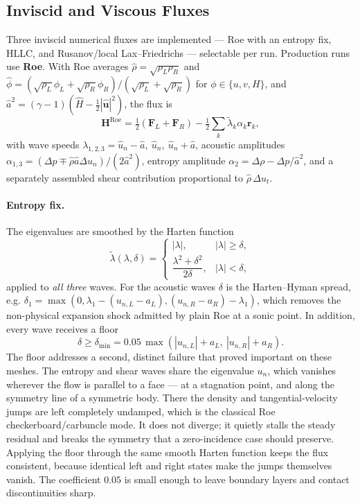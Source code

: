\subsection{Inviscid and Viscous Fluxes}
\label{sec:fluxes}

Three inviscid numerical fluxes are implemented --- Roe with an entropy fix,
HLLC, and Rusanov/local Lax--Friedrichs --- selectable per run. Production runs
use \textbf{Roe}. With Roe averages
$\hat{\rho}=\sqrt{\rho_L\rho_R}$ and
$\hat{\phi}=(\sqrt{\rho_L}\phi_L+\sqrt{\rho_R}\phi_R)/(\sqrt{\rho_L}+\sqrt{\rho_R})$
for $\phi\in\{u,v,H\}$, and $\hat{a}^2=(\gamma-1)(\hat{H}-\tfrac12|\hat{\mathbf{u}}|^2)$,
the flux is
\begin{equation}
  \mathbf{H}^{\mathrm{Roe}}=\tfrac12\left(\mathbf{F}_L+\mathbf{F}_R\right)
  -\tfrac12\sum_{k}\tilde{\lambda}_k\alpha_k\mathbf{r}_k ,
  \label{eq:roe}
\end{equation}
with wave speeds $\lambda_{1,2,3}=\hat{u}_n-\hat{a},\ \hat{u}_n,\ \hat{u}_n+\hat{a}$,
acoustic amplitudes
$\alpha_{1,3}=(\Delta p\mp\hat{\rho}\hat{a}\Delta u_n)/(2\hat{a}^2)$, entropy
amplitude $\alpha_2=\Delta\rho-\Delta p/\hat{a}^2$, and a separately assembled
shear contribution proportional to $\hat{\rho}\,\Delta u_t$.

\paragraph{Entropy fix.} The eigenvalues are smoothed by the Harten function
\begin{equation}
  \tilde{\lambda}(\lambda,\delta)=
  \begin{cases}
    |\lambda|, & |\lambda|\ge\delta,\\[2pt]
    \dfrac{\lambda^2+\delta^2}{2\delta}, & |\lambda|<\delta,
  \end{cases}
  \label{eq:harten}
\end{equation}
applied to \emph{all three} waves. For the acoustic waves $\delta$ is the
Harten--Hyman spread, e.g.
$\delta_1=\max\!\left(0,\lambda_1-(u_{n,L}-a_L),(u_{n,R}-a_R)-\lambda_1\right)$,
which removes the non-physical expansion shock admitted by plain Roe at a sonic
point. In addition, every wave receives a floor
\begin{equation}
  \delta \ge \delta_{\min}=0.05\,
  \max\!\left(|u_{n,L}|+a_L,\ |u_{n,R}|+a_R\right).
  \label{eq:floor}
\end{equation}
The floor addresses a second, distinct failure that proved important on these
meshes. The entropy and shear waves share the eigenvalue $u_n$, which vanishes
wherever the flow is parallel to a face --- at a stagnation point, and along the
symmetry line of a symmetric body. There the density and tangential-velocity
jumps are left completely undamped, which is the classical Roe
checkerboard/carbuncle mode. It does not diverge; it quietly stalls the steady
residual and breaks the symmetry that a zero-incidence case should preserve.
Applying the floor through the same smooth Harten function keeps the flux
consistent, because identical left and right states make the jumps themselves
vanish. The coefficient $0.05$ is small enough to leave boundary layers and
contact discontinuities sharp.

